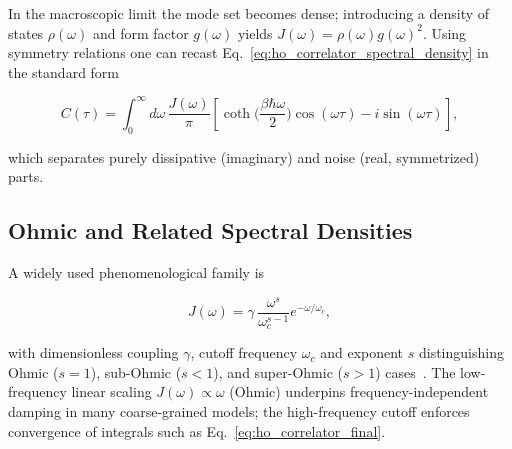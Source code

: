 \noindent
In the macroscopic limit the mode set becomes dense; introducing a density of states $\rho(\omega)$ and form factor $g(\omega)$ yields $J(\omega)=\rho(\omega) g(\omega)^2$. Using symmetry relations one can recast Eq.~\eqref{eq:ho_correlator_spectral_density} in the standard form

\begin{equation} \label{eq:ho_correlator_final}
	C(\tau) = \int_{0}^{\infty} d\omega \, \frac{J(\omega)}{\pi} \left[ \coth\Big(\frac{\beta \hbar \omega}{2}\Big) \cos(\omega \tau) - i \sin(\omega \tau) \right],
\end{equation}

\noindent
which separates purely dissipative (imaginary) and noise (real, symmetrized) parts.


\subsection{Ohmic and Related Spectral Densities}
\label{subsec:ohmic_spectral_density}

\noindent
A widely used phenomenological family is

\begin{equation} \label{eq:ho_ohmic_spectral_density}
	J(\omega) = \gamma \, \frac{\omega^{s}}{\omega_c^{s-1}} e^{-\omega/\omega_c},
\end{equation}

\noindent
with dimensionless coupling $\gamma$, cutoff frequency $\omega_c$ and exponent $s$ distinguishing Ohmic ($s=1$), sub-Ohmic ($s<1$), and super-Ohmic ($s>1$) cases~\cite{weiss2012quantumdissipativesystems, lambertetal2024qutip5quantum}. The low-frequency linear scaling $J(\omega) \propto \omega$ (Ohmic) underpins frequency-independent damping in many coarse-grained models; the high-frequency cutoff enforces convergence of integrals such as Eq.~\eqref{eq:ho_correlator_final}.

\iffalse
	\begin{figure}[t]
		\centering
		\texttt{[image: bath\_comparison\_combined\_0.010\_100.00\_100.000.png]}
		\caption{Comparison of representative bath models (Ohmic and Drude--Lorentz) showing spectral densities, associated power spectra, and time-domain correlation functions for coupling strength $\alpha = 0.1$, cutoff $\omega_c = 100$, and temperature $T=100$. Distinct spectral shapes map directly onto different relaxation and dephasing behaviors.}
		\label{fig:bath_comparison}
	\end{figure}
	\begin{figure}
		\centering
		\texttt{[image: temperature\_analysis\_ohmic\_bath.png]}
		\caption{Temperature dependence of the bath correlation function for an Ohmic bath with $\alpha = 1$ and cutoff $\omega_c = 100$. Higher temperatures increase the amplitude and decrease the correlation time, reflecting enhanced thermal fluctuations.}
		\label{fig:bath_temperature_comparison}
	\end{figure}
\fi
